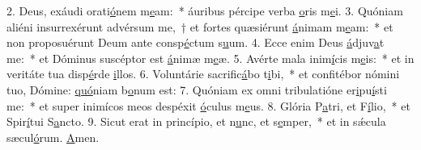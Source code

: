 2. Deus, exáudi orati\uline{ó}nem m\uline{e}am:~* áuribus pércipe verba \uline{o}ris m\uline{e}i.
3. Quóniam aliéni insurrexérunt advérsum me,~† et fortes quæsiérunt \uline{á}nimam m\uline{e}am:~* et non proposuérunt Deum ante consp\uline{é}ctum s\uline{u}um.
4. Ecce enim Deus \uline{á}djuv\uline{a}t me:~* et Dóminus suscéptor est \uline{á}nimæ m\uline{e}æ.
5. Avérte mala inim\uline{í}cis m\uline{e}is:~* et in veritáte tua disp\uline{é}rde \uline{i}llos.
6. Voluntárie sacrific\uline{á}bo t\uline{i}bi,~* et confitébor nómini tuo, Dómine: \uline{quó}niam b\uline{o}num est:
7. Quóniam ex omni tribulatióne er\uline{i}pu\uline{í}sti me:~* et super inimícos meos despéxit \uline{ó}culus m\uline{e}us.
8. Glória P\uline{a}tri, et F\uline{í}lio,~* et Spir\uline{í}tui S\uline{a}ncto.
9. Sicut erat in princípio, et n\uline{u}nc, et s\uline{e}mper,~* et in sǽcula sæcul\uline{ó}rum. \uline{A}men.
